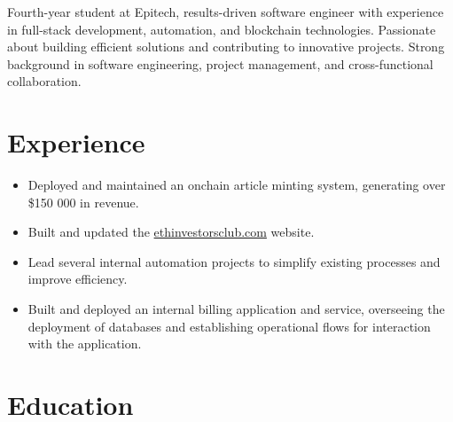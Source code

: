\documentclass[11pt,a4paper,sans]{moderncv}
\begin{document}
\makecvtitle

Fourth-year student at Epitech, results-driven software engineer with experience in full-stack development, automation, and blockchain technologies. 
Passionate about building efficient solutions and contributing to innovative projects. Strong background in software engineering, project management, and cross-functional collaboration.

\section{Experience}
{\begin{itemize}
    \item Deployed and maintained an onchain article minting system, generating over \$150 000 in revenue.
    \item Built and updated the \href{https://ethinvestorsclub.com}{ethinvestorsclub.com} website.
\end{itemize}}
{\begin{itemize}
    \item Lead several internal automation projects to simplify existing processes and improve efficiency.
\end{itemize}}
{\begin{itemize}
    \item Built and deployed an internal billing application and service, overseeing the deployment of databases and establishing operational flows for interaction with the application.
\end{itemize}}

\section{Education}
\end{document}
